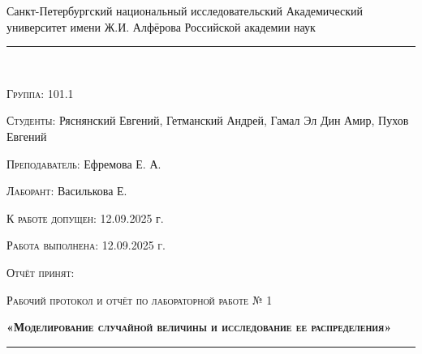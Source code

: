 \documentclass[12pt]{article}
\begin{document}
\begin{center}
    \large\textrm{Санкт-Петербургский национальный исследовательский Академический университет имени Ж.И. Алфёрова Российской академии наук}
\end{center}

\noindent\rule{\textwidth}{0.5pt}\\

\begin{minipage}{0.5\textwidth}
  \begin{flushleft}
	\textsc{Группа:} 101.1
	
	\textsc{Студенты:} Ряснянский Евгений, Гетманский Андрей, Гамал Эл Дин Амир, Пухов Евгений
	
	\textsc{Преподаватель:} Ефремова Е. А.
	
	\textsc{Лаборант:} Василькова Е.
  \end{flushleft}
\end{minipage}
\begin{minipage}{0.5\textwidth}
  \begin{flushleft}
	\textsc{К работе допущен:} 12.09.2025 г.
	
	\textsc{Работа выполнена: 12.09.2025 г.}
	
	\textsc{Отчёт принят:}
  \end{flushleft}
\end{minipage}


\begin{center}
     \large\textsc{Рабочий протокол и отчёт по лабораторной работе № 1}
    
    \textbf{\textsc{«Моделирование случайной величины и исследование ее распределения»}}
\end{center}

\noindent\rule{\textwidth}{0.5pt}\\
\end{document}
